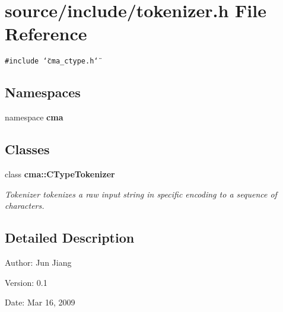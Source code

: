 \section{source/include/tokenizer.h File Reference}
\label{tokenizer_8h}
{\tt \#include \char`\"{}cma\_\-ctype.h\char`\"{}}\par
\subsection*{Namespaces}
\begin{CompactItemize}
\item 
namespace \textbf{cma}
\end{CompactItemize}
\subsection*{Classes}
\begin{CompactItemize}
\item 
class {\bf cma::CTypeTokenizer}
\begin{CompactList}\small\item\em Tokenizer tokenizes a raw input string in specific encoding to a sequence of characters. \item\end{CompactList}\end{CompactItemize}


\subsection{Detailed Description}
\begin{Desc}
\item[Author:]Jun Jiang \end{Desc}
\begin{Desc}
\item[Version:]0.1 \end{Desc}
\begin{Desc}
\item[Date:]Mar 16, 2009 \end{Desc}

